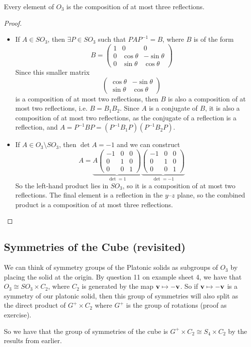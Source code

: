 \begin{corollary}
	Every element of $O_3$ is the composition of at most three reflections.
\end{corollary}
\begin{proof}
	\begin{itemize}
		\item If $A \in SO_3$, then $\exists P \in SO_3$ such that $PAP^{-1} = B$, where $B$ is of the form
		      \[ B = \begin{pmatrix}
				      1 & 0           & 0            \\
				      0 & \cos \theta & -\sin \theta \\
				      0 & \sin \theta & \cos \theta
			      \end{pmatrix} \]
		      Since this smaller matrix
		      \[ \begin{pmatrix}
				      \cos \theta & -\sin \theta \\
				      \sin \theta & \cos \theta
			      \end{pmatrix} \]
		      is a composition of at most two reflections, then $B$ is also a composition of at most two reflections, i.e. $B = B_1 B_2$. Since $A$ is a conjugate of $B$, it is also a composition of at most two reflections, as the conjugate of a reflection is a reflection, and $A = P^{-1}BP = (P^{-1}B_1P)(P^{-1}B_2P)$.
		\item If $A \in O_3 \setminus SO_3$, then $\det A = -1$ and we can construct
		      \[ A = \underbrace{A\begin{pmatrix}
					      -1 & 0 & 0 \\
					      0  & 1 & 0 \\
					      0  & 0 & 1
				      \end{pmatrix}}_{\det = 1}\underbrace{\begin{pmatrix}
					      -1 & 0 & 0 \\
					      0  & 1 & 0 \\
					      0  & 0 & 1
				      \end{pmatrix}}_{\det = -1} \]
		      So the left-hand product lies in $SO_3$, so it is a composition of at most two reflections. The final element is a reflection in the $y$--$z$ plane, so the combined product is a composition of at most three reflections.
	\end{itemize}
\end{proof}

\subsection{Symmetries of the Cube (revisited)}
We can think of symmetry groups of the Platonic solids as subgroups of $O_3$ by placing the solid at the origin. By question 11 on example sheet 4, we have that $O_3 \cong SO_3 \times C_2$, where $C_2$ is generated by the map $\vb v \mapsto -\vb v$. So if $\vb v\mapsto -\vb v$ is a symmetry of our platonic solid, then this group of symmetries will also split as the direct product of $G^+ \times C_2$ where $G^+$ is the group of rotations (proof as exercise).

So we have that the group of symmetries of the cube is $G^+ \times C_2 \cong S_4 \times C_2$ by the results from earlier.
